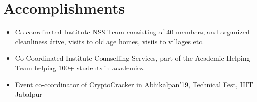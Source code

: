 \documentclass[letterpaper,11pt]{article}
\newcommand{\resumeItemList}[1]{
  \vspace{-2pt}\item\small{
    { #1}
  }
}
\newcommand{\resumeSubItemList}[1]{\resumeItemList{#1}\vspace{-4pt}}
\newcommand{\resumeSubHeadingListStart}{\begin{itemize}[leftmargin=*]}
\newcommand{\resumeSubHeadingListEnd}{\end{itemize}}
\begin{document}
\section{Accomplishments}
  \resumeSubHeadingListStart
    \resumeSubItemList{Co-coordinated Institute NSS Team consisting of 40 members, and organized cleanliness drive, visits to old age homes, visits to villages etc.}
    \resumeSubItemList{Co-Coordinated Institute Counselling Services, part of the Academic Helping Team helping 100+ students in academics.}
    \resumeSubItemList{Event co-coordinator of CryptoCracker in Abhikalpan'19, Technical Fest, IIIT Jabalpur}
  \resumeSubHeadingListEnd
\end{document}
